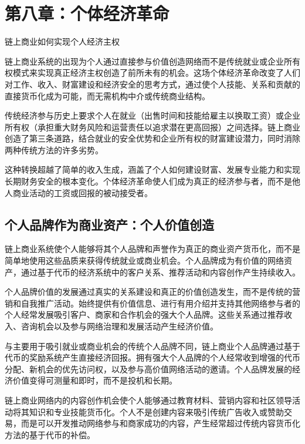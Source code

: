 \documentclass[
  Letterpaper,
]{scrbook}
\begin{document}
\chapter{第八章：个体经济革命}\label{sec-individual-economy}

链上商业如何实现个人经济主权

链上商业系统的出现为个人通过直接参与价值创造网络而不是传统就业或企业所有权模式来实现真正经济主权创造了前所未有的机会。这场个体经济革命改变了人们对工作、收入、财富建设和经济安全的思考方式，通过使个人技能、关系和贡献的直接货币化成为可能，而无需机构中介或传统商业结构。

传统经济参与历史上要求个人在就业（出售时间和技能给雇主以换取工资）或企业所有权（承担重大财务风险和运营责任以追求潜在更高回报）之间选择。链上商业创造了第三条道路，结合就业的安全优势和企业所有权的财富建设潜力，同时消除两种传统方法的许多劣势。

这种转换超越了简单的收入生成，涵盖了个人如何建设财富、发展专业能力和实现长期财务安全的根本变化。个体经济革命使人们成为真正的经济参与者，而不是他人商业活动的工资或回报的被动接受者。

\section{个人品牌作为商业资产：个人价值创造}\label{ux4e2aux4ebaux54c1ux724cux4f5cux4e3aux5546ux4e1aux8d44ux4ea7ux4e2aux4ebaux4ef7ux503cux521bux9020}

链上商业系统使个人能够将其个人品牌和声誉作为真正的商业资产货币化，而不是简单地使用这些品质来获得传统就业或商业机会。个人品牌成为有价值的网络资产，通过基于代币的经济系统中的客户关系、推荐活动和内容创作产生持续收入。

个人品牌价值的发展通过真实的关系建设和真正的价值创造发生，而不是传统的营销和自我推广活动。始终提供有价值信息、进行有用介绍并支持其他网络参与者的个人经常发展吸引客户、商家和合作机会的强大个人品牌。这些关系通过推荐收入、咨询机会以及参与网络治理和发展活动产生经济价值。

与主要用于吸引就业或商业机会的传统个人品牌不同，链上商业个人品牌通过基于代币的奖励系统产生直接经济回报。拥有强大个人品牌的个人经常收到增强的代币分配、新机会的优先访问权，以及参与高价值网络活动的邀请。个人品牌发展的经济价值变得可测量和即时，而不是投机和长期。

链上商业网络内的内容创作机会使个人能够通过教育材料、营销内容和社区领导活动将其知识和专业技能货币化。个人不是创建内容来吸引传统广告收入或赞助交易，而是可以开发推动网络参与和商家成功的内容，产生经常超过传统内容货币化方法的基于代币的补偿。
\end{document}
